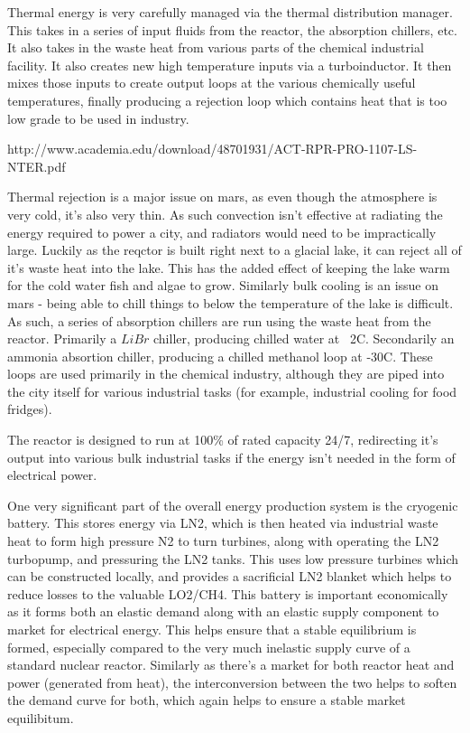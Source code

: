 \documentclass[10pt]{article}
\begin{document}
Thermal energy is very carefully managed via the thermal distribution manager. This takes in a series of input fluids from the reactor, the absorption chillers, etc. It also takes in the waste heat from various parts of the chemical industrial facility. It also creates new high temperature inputs via a turboinductor. It then mixes those inputs to create output loops at the various chemically useful temperatures, finally producing a rejection loop which contains heat that is too low grade to be used in industry.

http://www.academia.edu/download/48701931/ACT-RPR-PRO-1107-LS-NTER.pdf

Thermal rejection is a major issue on mars, as even though the atmosphere is very cold, it's also very thin. As such convection isn't effective at radiating the energy required to power a city, and radiators would need to be impractically large. Luckily as the reqctor is built right next to a glacial lake, it can reject all of it's waste heat into the lake. This has the added effect of keeping the lake warm for the cold water fish and algae to grow. Similarly bulk cooling is an issue on mars - being able to chill things to below the temperature of the lake is difficult. As such, a series of absorption chillers are run using the waste heat from the reactor. Primarily a $LiBr$ chiller, producing chilled water at ~2C. Secondarily an ammonia absortion chiller, producing a chilled methanol loop at -30C. These loops are used primarily in the chemical industry, although they are piped into the city itself for various industrial tasks (for example, industrial cooling for food fridges).

The reactor is designed to run at 100\% of rated capacity 24/7, redirecting it's output into various bulk industrial tasks if the energy isn't needed in the form of electrical power.

One very significant part of the overall energy production system is the cryogenic battery. This stores energy via LN2, which is then heated via industrial waste heat to form high pressure N2 to turn turbines, along with operating the LN2 turbopump, and pressuring the LN2 tanks. This uses low pressure turbines which can be constructed locally, and provides a sacrificial LN2 blanket which helps to reduce losses to the valuable LO2/CH4. This battery is important economically as it forms both an elastic demand along with an elastic supply component to market for electrical energy. This helps ensure that a stable equilibrium is formed, especially compared to the very much inelastic supply curve of a standard nuclear reactor. Similarly as there's a market for both reactor heat and power (generated from heat), the interconversion between the two helps to soften the demand curve for both, which again helps to ensure a stable market equilibitum.
\end{document}
